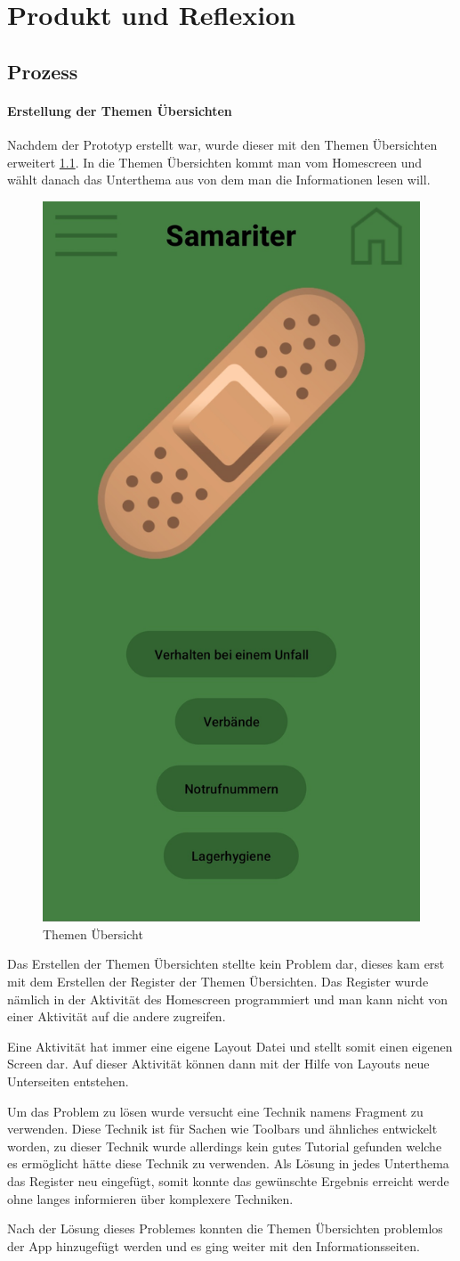 \chapter{Produkt und Reflexion}
\section{Prozess}
\subsubsection{Erstellung der Themen Übersichten}
Nachdem der Prototyp erstellt war, wurde dieser mit den Themen Übersichten erweitert \cref{themen_uebersicht}. In die Themen Übersichten kommt man vom Homescreen und wählt danach das Unterthema aus von dem man die Informationen lesen will. 
\begin{figure}[h]
    \centering
    \includegraphics[width=0.33\linewidth]{Picture/themen_uebersicht.jpg}
    \caption{Themen Übersicht}
    \label{themen_uebersicht}
\end{figure}
Das Erstellen der Themen Übersichten stellte kein Problem dar, dieses kam erst mit dem Erstellen der Register der Themen Übersichten. Das Register wurde nämlich in der Aktivität des Homescreen programmiert und man kann nicht von einer Aktivität auf die andere zugreifen. \par Eine Aktivität hat immer eine eigene Layout Datei und stellt somit einen eigenen Screen dar. Auf dieser Aktivität können dann mit der Hilfe von Layouts neue Unterseiten entstehen. \par 
Um das Problem zu lösen wurde versucht eine Technik namens Fragment zu verwenden. Diese Technik ist für Sachen wie Toolbars und ähnliches entwickelt worden, zu dieser Technik wurde allerdings kein gutes Tutorial gefunden welche es ermöglicht hätte diese Technik zu verwenden. Als Lösung in jedes Unterthema das Register neu eingefügt, somit konnte das gewünschte Ergebnis erreicht werde ohne langes informieren über komplexere Techniken.\par
Nach der Lösung dieses Problemes konnten die Themen Übersichten problemlos der App hinzugefügt werden und es ging weiter mit den Informationsseiten.

